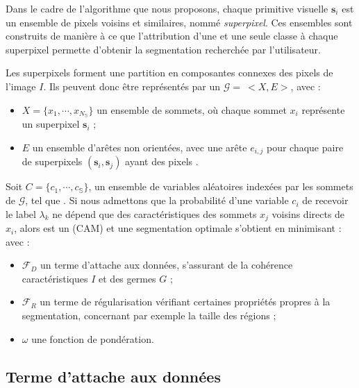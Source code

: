 Dans le cadre de l'algorithme que nous proposons, chaque primitive visuelle $\mathbf{s}_{i}$ est un ensemble de pixels voisins et similaires,  nommé \emph{superpixel}. Ces ensembles sont construits de manière à ce que l'attribution d'une et une seule classe à chaque superpixel permette d'obtenir la segmentation recherchée par l'utilisateur.

Les superpixels forment une partition en composantes connexes des pixels de l'image $I$. Ils peuvent donc être représentés par un  $\mathcal{G}=\ <X,E>$, avec :
\begin{itemize}
\item $X = \lbrace x_{1}, \cdots, x_{N_{\mathbb{S}}}  \rbrace$  un ensemble de sommets, où chaque sommet $x_{i}$ représente un superpixel $ \mathbf{s}_{i}$ ;
\item $E$ un ensemble d'arêtes non orientées, avec une arête $e_{i,j}$ pour chaque paire de superpixels $(\mathbf{s}_{i},\mathbf{s}_{j})$ ayant des pixels . 
\end{itemize}

Soit $C=\lbrace c_{1},\cdots,c_{\mathbb{S}} \rbrace$, un ensemble de variables aléatoires indexées par les sommets de $\mathcal{G}$, tel que . Si nous admettons que la probabilité d'une variable $c_{i}$ de recevoir le label $\lambda_{k}$ ne dépend que des caractéristiques des sommets $x_{j}$ voisins directs de $x_{i}$, alors  est un  (CAM) et une segmentation optimale  s'obtient en minimisant : 
avec :
\begin{itemize}
\item $\mathcal{F}_{D}$ un terme d'attache aux données, s'assurant de la cohérence  caractéristiques   $I$ et  des germes $G$ ;
\item $\mathcal{F}_{R}$ un terme de régularisation vérifiant certaines propriétés propres à la segmentation, concernant par exemple  la taille  des régions ;
\item  $\omega$  une fonction de pondération.
\end{itemize}

\subsection{Terme d'attache aux données}

